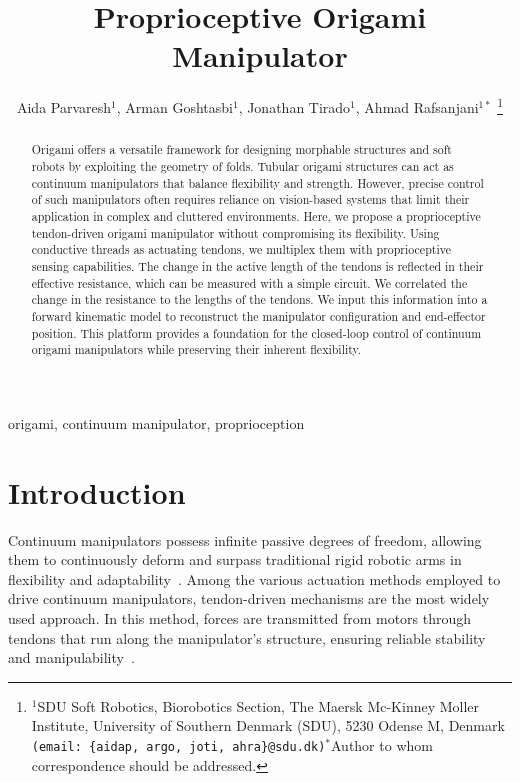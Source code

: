 \documentclass[journal, letterpaper]{IEEEtran}
\begin{document}
	\title{Proprioceptive Origami Manipulator}


\author{Aida Parvaresh$^{1}$, Arman Goshtasbi$^{1}$, Jonathan Tirado$^{1}$, Ahmad Rafsanjani$^{1*}$%
\thanks{$^{1}$SDU Soft Robotics, Biorobotics Section, The Maersk Mc-Kinney Moller Institute, University of Southern Denmark (SDU), 5230 Odense M, Denmark
      {\tt\small (email: \{aidap, argo, joti, ahra\}@sdu.dk)}\newline$^{*}$Author to whom correspondence should be addressed.} 
}
	\markboth{}{}
	\maketitle
    
\begin{abstract}
Origami offers a versatile framework for designing morphable structures and soft robots by exploiting the geometry of folds. Tubular origami structures can act as continuum manipulators that balance flexibility and strength. However, precise control of such manipulators often requires reliance on vision-based systems that limit their application in complex and cluttered environments. Here, we propose a proprioceptive tendon-driven origami manipulator without compromising its flexibility. Using conductive threads as actuating tendons, we multiplex them with proprioceptive sensing capabilities. The change in the active length of the tendons is reflected in their effective resistance, which can be measured with a simple circuit. We correlated the change in the resistance to the lengths of the tendons. We input this information into a forward kinematic model to reconstruct the manipulator configuration and end-effector position. This platform provides a foundation for the closed-loop control of continuum origami manipulators while preserving their inherent flexibility.
\end{abstract}

\begin{IEEEkeywords}
origami, continuum manipulator, proprioception
\end{IEEEkeywords}

\section{Introduction}

Continuum manipulators possess infinite passive degrees of freedom, allowing them to continuously deform and surpass traditional rigid robotic arms in flexibility and adaptability~\cite{russo2023continuum}. Among the various actuation methods employed to drive continuum manipulators, tendon-driven mechanisms are the most widely used approach. In this method, forces are transmitted from motors through tendons that run along the manipulator's structure, ensuring reliable stability and manipulability~\cite{amanov2021tendon}.
\end{document}
